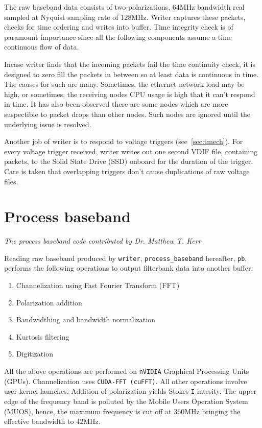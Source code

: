 \par The raw baseband data consists of two-polarizations, $64$MHz bandwidth real sampled at Nyquist sampling rate of $128$MHz. Writer captures these packets, checks for time ordering and writes into \dada buffer. Time integrity check is of paramount importance since all the following components assume a time continuous flow of data. 

\par Incase writer finds that the incoming packets fail the time continuity check, it is designed to zero fill the packets in between so at least data is continuous in time. The causes for such are many. 
Sometimes, the ethernet network load may be high, or sometimes, the receiving nodes CPU usage is high that it can't respond in time. 
It has also been observed there are some nodes which are more suspectible to packet drops than other nodes. Such nodes are ignored until the underlying issue is resolved. 

\par Another job of writer is to respond to voltage triggers (see~\autoref{sec:tmech}). For every voltage trigger received, writer writes out one second VDIF file, containing packets, to the Solid State Drive (SSD) onboard for the duration of the trigger. Care is taken that overlapping triggers don't cause duplications of raw voltage files.

\section {Process baseband} 
\hfill \emph {The process baseband code contributed by Dr. Matthew T. Kerr}

\par Reading raw baseband produced by \texttt{writer}, \texttt{process\_baseband} hereafter, \texttt{pb}, performs the following operations to output filterbank data into another \dada buffer:

\begin{enumerate}
\item Channelization using Fast Fourier Transform (FFT)
\item Polarization addition
\item Bandwidthing and bandwidth normalization
\item Kurtosis filtering
\item Digitization
\end{enumerate}

\par All the above operations are performed on \texttt{nVIDIA} Graphical Processing Units (GPUs). Channelization uses \texttt{CUDA-FFT (cuFFT)}. 
All other operations involve user kernel launches. Addition of polarization yields Stokes \texttt{I} intesity. The upper edge of the \vf frequency band is polluted by the Mobile Users Operation System (MUOS), hence, the maximum frequency is cut off at $360$MHz bringing the effective bandwidth to $42$MHz. 

